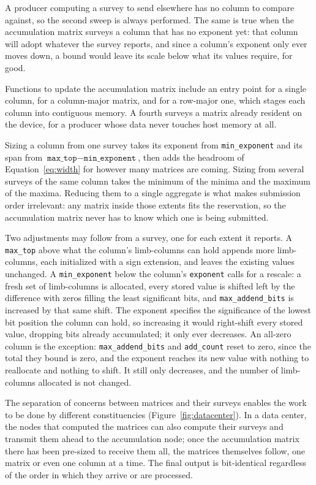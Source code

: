 \documentclass[acmsmall,screen,review]{acmart}
\newcommand{\code}[1]{\texttt{#1}}
\begin{document}
A producer computing a survey to send elsewhere has no column to compare against, so the second sweep is always performed. The same is true when the accumulation matrix surveys a column that has no exponent yet: that column will adopt whatever the survey reports, and since a column's exponent only ever moves down, a bound would leave its scale below what its values require, for good.

Functions to update the accumulation matrix include an entry point for a single column, for a column-major matrix, and for a row-major one, which stages each column into contiguous memory. A fourth surveys a matrix already resident on the device, for a producer whose data never touches host memory at all.

Sizing a column from one survey takes its exponent from \code{min\_exponent} and its span from $\code{max\_top} - \code{min\_exponent}$, then adds the headroom of Equation~\ref{eq:width} for however many matrices are coming. Sizing from several surveys of the same column takes the minimum of the minima and the maximum of the maxima. Reducing them to a single aggregate is what makes submission order irrelevant: any matrix inside those extents fits the reservation, so the accumulation matrix never has to know which one is being submitted.

Two adjustments may follow from a survey, one for each extent it reports. A \code{max\_top} above what the column's limb-columns can hold appends more limb-columns, each initialized with a sign extension, and leaves the existing values unchanged. A \code{min\_exponent} below the column's \code{exponent} calls for a rescale: a fresh set of limb-columns is allocated, every stored value is shifted left by the difference with zeros filling the least significant bits, and \code{max\_addend\_bits} is increased by that same shift. The exponent specifies the significance of the lowest bit position the column can hold, so increasing it would right-shift every stored value, dropping bits already accumulated; it only ever decreases. An all-zero column is the exception: \code{max\_addend\_bits} and \code{add\_count} reset to zero, since the total they bound is zero, and the exponent reaches its new value with nothing to reallocate and nothing to shift. It still only decreases, and the number of limb-columns allocated is not changed.

The separation of concerns between matrices and their surveys enables the work to be done by different constituencies (Figure~\ref{fig:datacenter}). In a data center, the nodes that computed the matrices can also compute their surveys and transmit them ahead to the accumulation node; once the accumulation matrix there has been pre-sized to receive them all, the matrices themselves follow, one matrix or even one column at a time. The final output is bit-identical regardless of the order in which they arrive or are processed.
\end{document}
